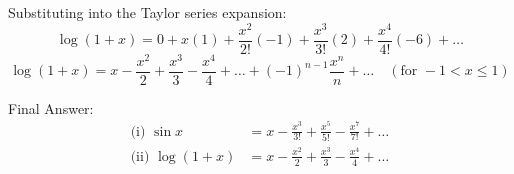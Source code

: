 \documentclass[11pt, a4paper]{article}
\begin{document}
Substituting into the Taylor series expansion:
$$\log(1+x) = 0 + x(1) + \frac{x^2}{2!}(-1) + \frac{x^3}{3!}(2) + \frac{x^4}{4!}(-6) + \dots$$
$$\log(1+x) = x - \frac{x^2}{2} + \frac{x^3}{3} - \frac{x^4}{4} + \dots + (-1)^{n-1}\frac{x^n}{n} + \dots \quad (\text{for } -1 < x \le 1)$$

Final Answer:
$$
\boxed{\begin{aligned}
\text{(i) } \sin x &= x - \frac{x^3}{3!} + \frac{x^5}{5!} - \frac{x^7}{7!} + \dots \\
\text{(ii) } \log(1+x) &= x - \frac{x^2}{2} + \frac{x^3}{3} - \frac{x^4}{4} + \dots
\end{aligned}}
$$
\end{document}
